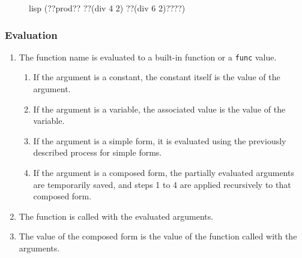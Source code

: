 \begin{figure}[htp]
    \centering
    \begin{cminted}[autogobble=true, escapeinside=??]{lisp}
        (??prod?? ??(div 4 2) ??(div 6 2)????)
    \end{cminted}
    \captionsetup[figure]{font=small, skip=3.5em}
\end{figure}

\subsubsection{Evaluation}
\begin{enumerate}
    \item The function name is evaluated to a built-in function or a \texttt{func} value.
    \begin{enumerate}
        \item If the argument is a constant, the constant itself is the value of the argument.
        \item If the argument is a variable, the associated value is the value of the variable.
        \item If the argument is a simple form, it is evaluated using the previously described process for simple forms.
        \item If the argument is a composed form, the partially evaluated arguments are temporarily saved, and steps 1 to 4 are applied recursively to that composed form.
    \end{enumerate}
    \item The function is called with the evaluated arguments.
    \item The value of the composed form is the value of the function called with the arguments.
\end{enumerate}

